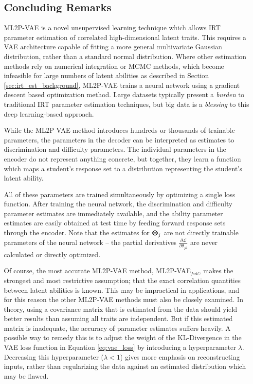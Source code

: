 \subsection{Concluding Remarks}
ML2P-VAE is a novel unsupervised learning technique which allows IRT parameter estimation of correlated high-dimensional latent traits. This requires a VAE architecture capable of fitting a more general multivariate Gaussian distribution, rather than a standard normal distribution. Where other estimation methods rely on numerical integration or MCMC methods, which become infeasible for large numbers of latent abilities as described in Section \ref{sec:irt_est_background}, ML2P-VAE trains a neural network using a gradient descent based optimization method. Large datasets typically present a \textit{burden} to traditional IRT parameter estimation techniques, but big data is a \textit{blessing} to this deep learning-based approach.

While the ML2P-VAE method introduces hundreds or thousands of trainable parameters, the parameters in the decoder can be interpreted as estimates to discrimination and difficulty parameters. The individual parameters in the encoder do not represent anything concrete, but together, they learn a function which maps a student's response set to a distribution representing the student's latent ability.

All of these parameters are trained simultaneously by optimizing a single loss function. After training the neural network, the discrimination and difficulty parameter estimates are immediately available, and the ability parameter estimates are easily obtained at test time by feeding forward response sets through the encoder. Note that the estimates for $\boldsymbol{\Theta}_j$ are not directly trainable parameters of the neural network -- the partial derivatives $\frac{\partial \mathcal{L}}{\partial \theta_{jk}}$ are never calculated or directly optimized.

Of course, the most accurate ML2P-VAE method, ML2P-VAE$_{full}$, makes the strongest and most restrictive assumption; that the exact correlation quantities between latent abilities is known. This may be impractical in applications, and for this reason the other ML2P-VAE methods must also be closely examined. In theory, using a covariance matrix that is estimated from the data should yield better results than assuming all traits are independent. But if this estimated matrix is inadequate, the accuracy of parameter estimates suffers heavily. A possible way to remedy this is to adjust the weight of the KL-Divergence in the VAE loss function in Equation \ref{eq:vae_loss} by introducing a hyperparameter $\lambda$. Decreasing this hyperparameter ($\lambda < 1$) gives more emphasis on reconstructing inputs, rather than regularizing the data against an estimated distribution which may be flawed.

